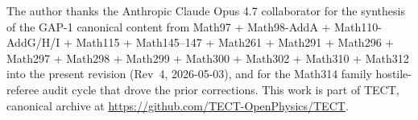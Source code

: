 \begin{acknowledgments}
The author thanks the Anthropic Claude Opus 4.7 collaborator for
the synthesis of the GAP-1 canonical content from
Math97 + Math98-AddA + Math110-AddG/H/I + Math115 + Math145--147 +
Math261 + Math291 + Math296 + Math297 + Math298 + Math299 + Math300
+ Math302 + Math310 + Math312 into the present revision (Rev~4,
2026-05-03), and for the Math314 family hostile-referee audit
cycle that drove the prior corrections. This work is part of TECT,
canonical archive at \url{https://github.com/TECT-OpenPhysics/TECT}.
\end{acknowledgments}





